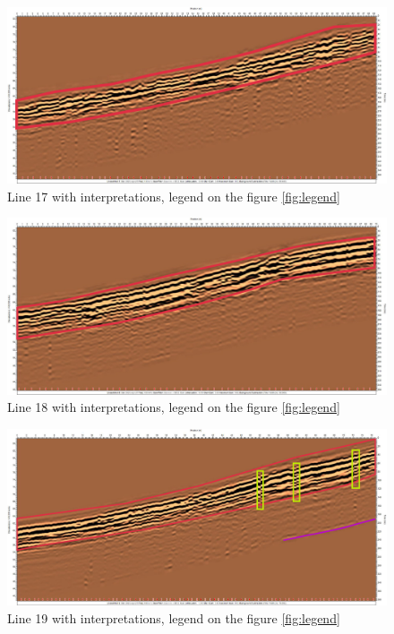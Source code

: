 \begin{figure}[p]
    \centering
    \includegraphics[width=\linewidth]{Images/00_Results/line17_edited.jpg}
    \caption{Line 17 with interpretations, legend on the figure \ref{fig:legend}}
    \label{fig:line17}
\end{figure}

\begin{figure}[p]
    \centering
    \includegraphics[width=\linewidth]{Images/00_Results/line18_edited.jpg}
    \caption{Line 18 with interpretations, legend on the figure \ref{fig:legend}}
    \label{fig:line18}
\end{figure}

\begin{figure}[p]
    \centering
    \includegraphics[width=\linewidth]{Images/00_Results/line19_edited.jpg}
    \caption{Line 19 with interpretations, legend on the figure \ref{fig:legend}}
    \label{fig:line19}
\end{figure}

